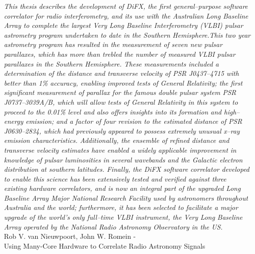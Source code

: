 \textit{This thesis describes the development of DiFX, the first general–purpose software correlator for radio interferometry, and its use with the Australian Long Baseline Array to complete the largest Very Long Baseline Interferometry (VLBI) pulsar astrometry program undertaken to date in the Southern Hemisphere.This two year astrometry program has resulted in the measurement of seven new pulsar parallaxes, which has more than trebled the number of measured VLBI pulsar parallaxes in the Southern Hemisphere. These measurements included a determination of the distance and transverse velocity of PSR J0437–4715 with better than 1\% accuracy, enabling improved tests of General Relativity; the first significant measurement of parallax for the famous double pulsar system PSR J0737–3039A/B, which will allow tests of General Relativity in this system to proceed to the 0.01\% level and also offers insights into its formation and high–energy emission; and a factor of four revision to the estimated distance of PSR J0630–2834, which had previously appeared to possess extremely unusual x–ray emission characteristics. Additionally, the ensemble of refined distance and transverse velocity estimates have enabled a widely applicable improvement in knowledge of pulsar luminosities in several wavebands and the Galactic electron distribution at southern latitudes. Finally, the DiFX software correlator developed to enable this science has been extensively tested and verified against three existing hardware correlators, and is now an integral part of the upgraded Long Baseline Array Major National Research Facility used by astronomers throughout Australia and the world; furthermore, it has been selected to facilitate a major upgrade of the world’s only full–time VLBI instrument, the Very Long Baseline Array operated by the National Radio Astronomy Observatory in the US.
}\\
\noindent
{\large Rob V. van Nieuwpoort,
John W. Romein  - \hfill \\ Using Many-Core Hardware to Correlate
Radio Astronomy Signals }

